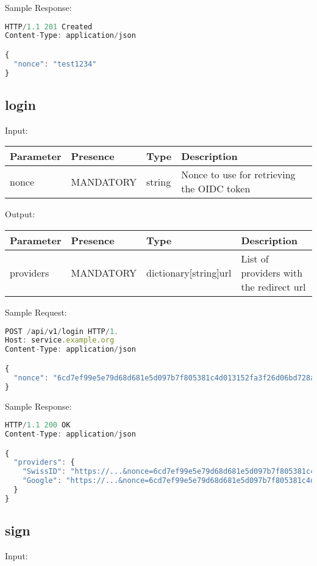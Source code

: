 Sample Response:
\begin{lstlisting}[caption={hashes response}, captionpos=b, language=JavaScript, label={lst:hashesresponse}]
HTTP/1.1 201 Created
Content-Type: application/json

{
  "nonce": "test1234"
}
\end{lstlisting}

\subsection{login}
Input:

\begin{tabular}{|l|l|l|l|}
	\hline
	Parameter & Presence & Type & Description \\ \hline
	nonce & MANDATORY & string & Nonce to use for retrieving the OIDC token \\ \hline
\end{tabular}

Output:

\begin{tabular}{|l|l|l|l|}
	\hline
	Parameter & Presence & Type & Description \\ \hline
	providers & MANDATORY & dictionary[string]url & List of providers with the redirect url \\ \hline
\end{tabular}

Sample Request:
\begin{lstlisting}[caption={login request}, captionpos=b, language=JavaScript, label={lst:loginrequest}]
POST /api/v1/login HTTP/1.
Host: service.example.org
Content-Type: application/json

{
  "nonce": "6cd7ef99e5e79d68d681e5d097b7f805381c4d013152fa3f26d06bd728ae49fa"
}
\end{lstlisting}

Sample Response:

\begin{lstlisting}[caption={login response}, captionpos=b, language=JavaScript, label={lst:loginresponse}]
HTTP/1.1 200 OK
Content-Type: application/json

{
  "providers": {
    "SwissID": "https://...&nonce=6cd7ef99e5e79d68d681e5d097b7f805381c4d013152fa3f26d06bd728ae49fa",
    "Google": "https://...&nonce=6cd7ef99e5e79d68d681e5d097b7f805381c4d013152fa3f26d06bd728ae49fa"
  }
}
\end{lstlisting}

\subsection{sign}
Input:

